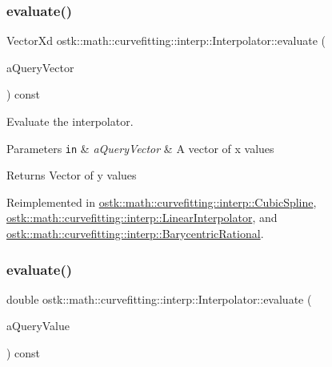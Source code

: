 \subsubsection{\texorpdfstring{evaluate()}{evaluate()}\hspace{0.1cm}{\footnotesize\ttfamily [1/2]}}
{\footnotesize\ttfamily Vector\+Xd ostk\+::math\+::curvefitting\+::interp\+::\+Interpolator\+::evaluate (\begin{DoxyParamCaption}\item[{const Vector\+Xd \&}]{a\+Query\+Vector }\end{DoxyParamCaption}) const\hspace{0.3cm}{\ttfamily [virtual]}}



Evaluate the interpolator. 


\begin{DoxyParams}[1]{Parameters}
\mbox{\tt in}  & {\em a\+Query\+Vector} & A vector of x values \\
\hline
\end{DoxyParams}
\begin{DoxyReturn}{Returns}
Vector of y values 
\end{DoxyReturn}


Reimplemented in \hyperlink{classostk_1_1math_1_1curvefitting_1_1interp_1_1_cubic_spline_a69c23827173fe8ee587d468551246fd9}{ostk\+::math\+::curvefitting\+::interp\+::\+Cubic\+Spline}, \hyperlink{classostk_1_1math_1_1curvefitting_1_1interp_1_1_linear_interpolator_abf0d1f4f1bf3dc1a64cfb1183c8e3e83}{ostk\+::math\+::curvefitting\+::interp\+::\+Linear\+Interpolator}, and \hyperlink{classostk_1_1math_1_1curvefitting_1_1interp_1_1_barycentric_rational_a4fbf8e51d6c5c383dca899b3e06fe043}{ostk\+::math\+::curvefitting\+::interp\+::\+Barycentric\+Rational}.

\mbox{\label{classostk_1_1math_1_1curvefitting_1_1interp_1_1_interpolator_af678ba11fe02754aeaa821bc101fcd87}} 
\subsubsection{\texorpdfstring{evaluate()}{evaluate()}\hspace{0.1cm}{\footnotesize\ttfamily [2/2]}}
{\footnotesize\ttfamily double ostk\+::math\+::curvefitting\+::interp\+::\+Interpolator\+::evaluate (\begin{DoxyParamCaption}\item[{const double \&}]{a\+Query\+Value }\end{DoxyParamCaption}) const\hspace{0.3cm}{\ttfamily [virtual]}}



